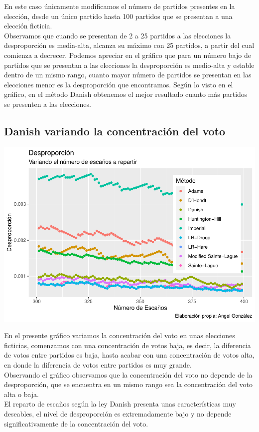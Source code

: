 \documentclass[12pt,a4paper,]{book}
\numberwithin{dummy}{section}
\theoremstyle{ocrenumbox}
\theoremstyle{blacknumex}
\theoremstyle{blacknumbox}
\theoremstyle{ocrenum}
\theoremstyle{ocrenum}
\begin{document}
En este caso únicamente modificamos el número de partidos presentes en
la elección, desde un único partido hasta 100 partidos que se presentan
a una elección ficticia.\\
Observamos que cuando se presentan de 2 a 25 partidos a las elecciones
la desproporción es media-alta, alcanza su máximo con 25 partidos, a
partir del cual comienza a decrecer. Podemos apreciar en el gráfico que
para un número bajo de partidos que se presentan a las elecciones la
desproporción es medio-alta y estable dentro de un mismo rango, cuanto
mayor número de partidos se presentan en las elecciones menor es la
desproporción que encontramos. Según lo visto en el gráfico, en el
método Danish obtenemos el mejor resultado cuanto más partidos se
presenten a las elecciones.

\hypertarget{danish-variando-la-concentraciuxf3n-del-voto}{%
\subsection{Danish variando la concentración del
voto}\label{danish-variando-la-concentraciuxf3n-del-voto}}

\begin{center}\includegraphics[width=0.95\linewidth]{figurasR/unnamed-chunk-50-1} \end{center}

En el presente gráfico variamos la concentración del voto en unas
elecciones ficticias, comenzamos con una concentración de votos baja, es
decir, la diferencia de votos entre partidos es baja, hasta acabar con
una concentración de votos alta, en donde la diferencia de votos entre
partidos es muy grande.\\
Observando el gráfico observamos que la concentración del voto no
depende de la desproporción, que se encuentra en un mismo rango sea la
concentración del voto alta o baja.\\
El reparto de escaños según la ley Danish presenta unas características
muy deseables, el nivel de desproporción es extremadamente bajo y no
depende significativamente de la concentración del voto.
\end{document}
